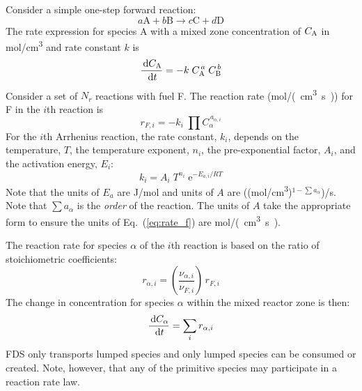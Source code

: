 Consider a simple one-step forward reaction:
\begin{equation}\label{eq:generic_1step}
a\mathrm{A} + b\mathrm{B} \rightarrow c\mathrm{C} + d\mathrm{D}
\end{equation}
The rate expression for species A with a mixed zone concentration of $C_{\mbox{\scriptsize A}}$ in \unit{mol/cm^3} and rate constant $k$ is
\begin{equation}\label{eq:generic_rate}
\frac{\,\mathrm{d} C_{\mbox{\scriptsize A}}}{\,\mathrm{d} t}= -k\; C_{\mbox{\scriptsize A}}^{\,a}\; C_{\mbox{\scriptsize B}}^{\,b}
\end{equation}
Consider a set of $N_r$ reactions with fuel F. The reaction rate (\unit{mol/(cm^3.s)}) for F in the $i$th reaction is
\begin{equation}\label{eq:rate_f}
r_{\unit{F},i}= -k_{i}\; \prod C_{\alpha}^{\,a_{\alpha,i}}
\end{equation}
For the $i$th Arrhenius reaction, the rate constant, $k_i$, depends on the temperature, $T$, the temperature exponent, $n_i$, the pre-exponential factor, $A_i$, and the activation energy, $E_i$:
\begin{equation}\label{eq:rate_cons}
k_i = A_i\;T^{n_i}\;\mathrm{e}^{-E_{a,i}/RT}
\end{equation}
Note that the units of $E_a$ are J/mol and units of $A$ are ((\unit{mol/cm^3})$^{1-\sum a_{\alpha}}$)/s.  Note that $\sum a_{\alpha}$ is the \emph{order} of the reaction.  The units of $A$ take the appropriate form to ensure the units of Eq.~(\ref{eq:rate_f}) are \unit{mol/(cm^3.s)}.

The reaction rate for species $\alpha$ of the $i$th reaction is based on the ratio of stoichiometric coefficients:
\begin{equation}\label{eq:rate_a}
r_{\alpha,i}= \left(\frac{\nu_{\alpha,i}}{\nu_{F,i}}\right)\,r_{\unit{F},i}
\end{equation}
The change in concentration for species $\alpha$ within the mixed reactor zone is then:
\begin{equation}\label{rate_expression}
\frac{\,\mathrm{d} C_{\alpha}}{\,\mathrm{d} t} = \sum_{i} r_{\alpha,i}
\end{equation}
FDS only transports lumped species and only lumped species can be consumed or created.  Note, however, that any of the primitive species may participate in a reaction rate law.

